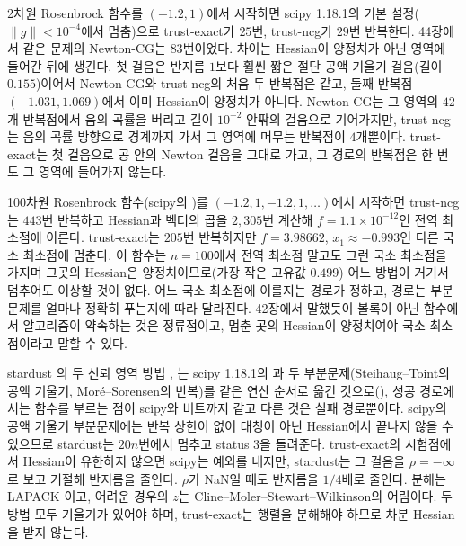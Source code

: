 2차원 Rosenbrock 함수를 $(-1.2,1)$에서 시작하면 scipy 1.18.1의 기본 설정($\|g\|<10^{-4}$에서 멈춤)으로 trust-exact가 $25$번, trust-ncg가 $29$번 반복한다. 44장에서 같은 문제의 Newton-CG는 $83$번이었다. 차이는 Hessian이 양정치가 아닌 영역에 들어간 뒤에 생긴다. 첫 걸음은 반지름 $1$보다 훨씬 짧은 절단 공액 기울기 걸음(길이 $0.155$)이어서 Newton-CG와 trust-ncg의 처음 두 반복점은 같고, 둘째 반복점 $(-1.031,1.069)$에서 이미 Hessian이 양정치가 아니다. Newton-CG는 그 영역의 $42$개 반복점에서 음의 곡률을 버리고 길이 $10^{-2}$ 안팎의 걸음으로 기어가지만, trust-ncg는 음의 곡률 방향으로 경계까지 가서 그 영역에 머무는 반복점이 $4$개뿐이다. trust-exact는 첫 걸음으로 공 안의 Newton 걸음을 그대로 가고, 그 경로의 반복점은 한 번도 그 영역에 들어가지 않는다.

100차원 Rosenbrock 함수(scipy의 )를 $(-1.2,1,-1.2,1,\dots)$에서 시작하면 trust-ncg는 $443$번 반복하고 Hessian과 벡터의 곱을 $2{,}305$번 계산해 $f=1.1\times10^{-12}$인 전역 최소점에 이른다. trust-exact는 $205$번 반복하지만 $f=3.98662$, $x_1\approx-0.993$인 다른 국소 최소점에 멈춘다. 이 함수는 $n=100$에서 전역 최소점 말고도 그런 국소 최소점을 가지며 그곳의 Hessian은 양정치이므로(가장 작은 고유값 $0.499$) 어느 방법이 거기서 멈추어도 이상할 것이 없다. 어느 국소 최소점에 이를지는 경로가 정하고, 경로는 부분문제를 얼마나 정확히 푸는지에 따라 달라진다. 42장에서 말했듯이 볼록이 아닌 함수에서 알고리즘이 약속하는 것은 정류점이고, 멈춘 곳의 Hessian이 양정치여야 국소 최소점이라고 말할 수 있다.

\begin{instardust}
stardust 의 두 신뢰 영역 방법 , 는 scipy 1.18.1의 과 두 부분문제(Steihaug--Toint의 공액 기울기, Moré--Sorensen의 반복)를 같은 연산 순서로 옮긴 것으로(), 성공 경로에서는 함수를 부르는 점이 scipy와 비트까지 같고 다른 것은 실패 경로뿐이다. scipy의 공액 기울기 부분문제에는 반복 상한이 없어 대칭이 아닌 Hessian에서 끝나지 않을 수 있으므로 stardust는 $20n$번에서 멈추고 status $3$을 돌려준다. trust-exact의 시험점에서 Hessian이 유한하지 않으면 scipy는 예외를 내지만, stardust는 그 걸음을 $\rho=-\infty$로 보고 거절해 반지름을 줄인다. $\rho$가 NaN일 때도 반지름을 $1/4$배로 줄인다. 분해는 LAPACK 이고, 어려운 경우의 $z$는 Cline--Moler--Stewart--Wilkinson의 어림이다. 두 방법 모두 기울기가 있어야 하며, trust-exact는 행렬을 분해해야 하므로 차분 Hessian을 받지 않는다.
\end{instardust}

